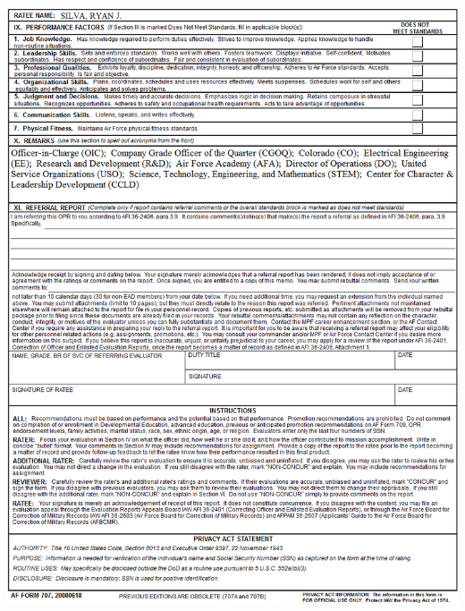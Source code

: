 \documentclass{article}
\begin{document}
\includegraphics[scale=.65]{OPR2012-2013b}
\label{sec:OPR2012}
\newpage
\end{document}
